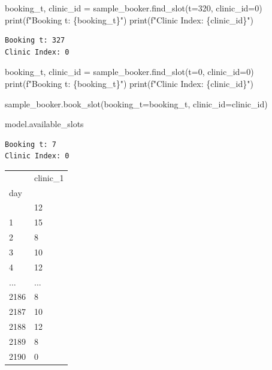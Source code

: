 \documentclass[
  letterpaper,
  DIV=11,
  numbers=noendperiod]{scrreprt}
\newenvironment{Shaded}{}{}
\newcommand{\BuiltInTok}[1]{\textcolor[rgb]{0.84,0.23,0.29}{#1}}
\newcommand{\DecValTok}[1]{\textcolor[rgb]{0.00,0.36,0.77}{#1}}
\newcommand{\NormalTok}[1]{\textcolor[rgb]{0.14,0.16,0.18}{#1}}
\newcommand{\OperatorTok}[1]{\textcolor[rgb]{0.14,0.16,0.18}{#1}}
\newcommand{\SpecialCharTok}[1]{\textcolor[rgb]{0.00,0.36,0.77}{#1}}
\newcommand{\SpecialStringTok}[1]{\textcolor[rgb]{0.01,0.18,0.38}{#1}}
\begin{document}
\begin{Shaded}
\begin{Highlighting}[]
\NormalTok{booking\_t, clinic\_id }\OperatorTok{=}\NormalTok{ sample\_booker.find\_slot(t}\OperatorTok{=}\DecValTok{320}\NormalTok{, clinic\_id}\OperatorTok{=}\DecValTok{0}\NormalTok{)}
\BuiltInTok{print}\NormalTok{(}\SpecialStringTok{f"Booking t: }\SpecialCharTok{\{}\NormalTok{booking\_t}\SpecialCharTok{\}}\SpecialStringTok{"}\NormalTok{)}
\BuiltInTok{print}\NormalTok{(}\SpecialStringTok{f"Clinic Index: }\SpecialCharTok{\{}\NormalTok{clinic\_id}\SpecialCharTok{\}}\SpecialStringTok{"}\NormalTok{)}
\end{Highlighting}
\end{Shaded}

\begin{verbatim}
Booking t: 327
Clinic Index: 0
\end{verbatim}

\begin{Shaded}
\begin{Highlighting}[]
\NormalTok{booking\_t, clinic\_id }\OperatorTok{=}\NormalTok{ sample\_booker.find\_slot(t}\OperatorTok{=}\DecValTok{0}\NormalTok{, clinic\_id}\OperatorTok{=}\DecValTok{0}\NormalTok{)}
\BuiltInTok{print}\NormalTok{(}\SpecialStringTok{f"Booking t: }\SpecialCharTok{\{}\NormalTok{booking\_t}\SpecialCharTok{\}}\SpecialStringTok{"}\NormalTok{)}
\BuiltInTok{print}\NormalTok{(}\SpecialStringTok{f"Clinic Index: }\SpecialCharTok{\{}\NormalTok{clinic\_id}\SpecialCharTok{\}}\SpecialStringTok{"}\NormalTok{)}

\NormalTok{sample\_booker.book\_slot(booking\_t}\OperatorTok{=}\NormalTok{booking\_t, clinic\_id}\OperatorTok{=}\NormalTok{clinic\_id)}

\NormalTok{model.available\_slots}
\end{Highlighting}
\end{Shaded}

\begin{verbatim}
Booking t: 7
Clinic Index: 0
\end{verbatim}

\begin{longtable}[]{@{}ll@{}}
\toprule\noalign{}
& clinic\_1 \\
day & \\
\midrule\noalign{}
\endhead
\bottomrule\noalign{}
\endlastfoot
0 & 12 \\
1 & 15 \\
2 & 8 \\
3 & 10 \\
4 & 12 \\
... & ... \\
2186 & 8 \\
2187 & 10 \\
2188 & 12 \\
2189 & 8 \\
2190 & 0 \\
\end{longtable}
\end{document}
